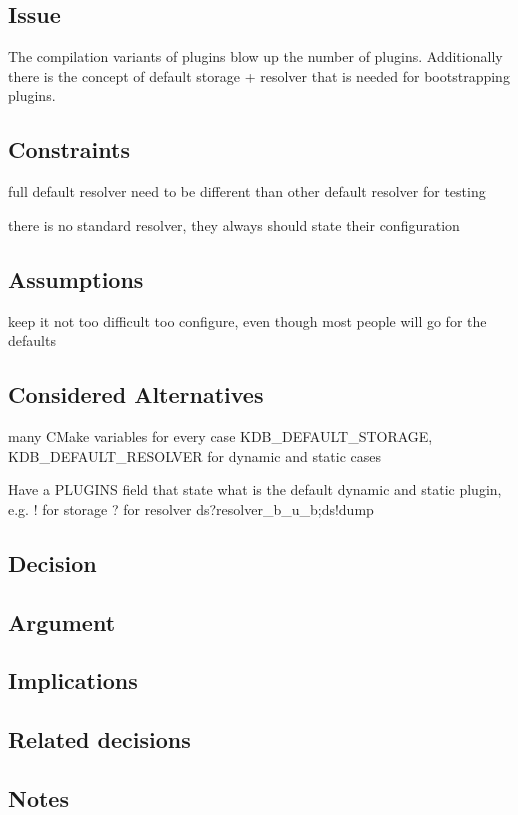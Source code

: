 \subsection*{Issue}

The compilation variants of plugins blow up the number of plugins. Additionally there is the concept of default storage + resolver that is needed for bootstrapping plugins.

\subsection*{Constraints}


\begin{DoxyItemize}
\item full default resolver need to be different than other default resolver for testing
\item there is no standard resolver, they always should state their configuration
\end{DoxyItemize}

\subsection*{Assumptions}


\begin{DoxyItemize}
\item keep it not too difficult too configure, even though most people will go for the defaults
\end{DoxyItemize}

\subsection*{Considered Alternatives}


\begin{DoxyItemize}
\item many C\+Make variables for every case K\+D\+B\+\_\+\+D\+E\+F\+A\+U\+L\+T\+\_\+\+S\+T\+O\+R\+A\+GE, K\+D\+B\+\_\+\+D\+E\+F\+A\+U\+L\+T\+\_\+\+R\+E\+S\+O\+L\+V\+ER for dynamic and static cases
\item Have a P\+L\+U\+G\+I\+NS field that state what is the default dynamic and static plugin, e.\+g. ! for storage ? for resolver ds?resolver\+\_\+b\+\_\+u\+\_\+b;ds!dump
\end{DoxyItemize}

\subsection*{Decision}

\subsection*{Argument}

\subsection*{Implications}

\subsection*{Related decisions}

\subsection*{Notes}